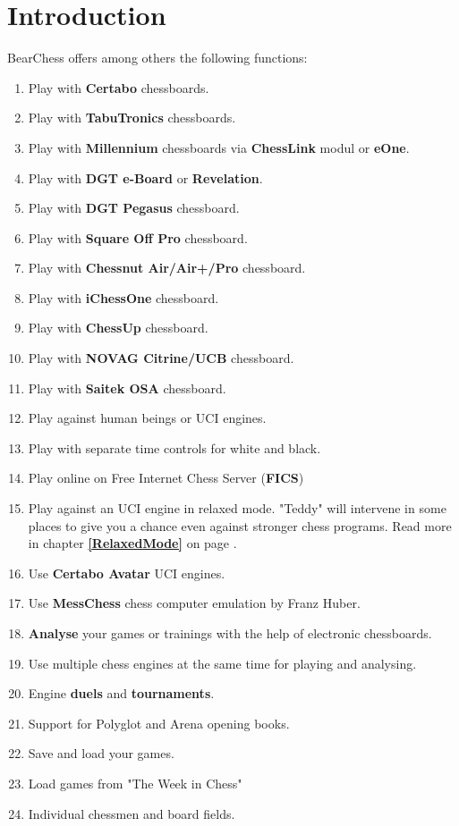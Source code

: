 \documentclass[11pt,a4paper]{article}
\begin{document}
\section{Introduction}
BearChess offers among others the following functions:
\begin{enumerate}
	  \item Play with \textbf{Certabo} chessboards.
	  \item Play with \textbf{TabuTronics} chessboards.	  
	  \item Play with \textbf{Millennium} chessboards via \textbf{ChessLink} modul or \textbf{eOne}.
 	  \item Play with \textbf{DGT e-Board} or \textbf{Revelation}.	  
	  \item Play with \textbf{DGT Pegasus} chessboard.	  
	  \item Play with \textbf{Square Off Pro} chessboard.	  	  
	  \item Play with \textbf{Chessnut Air/Air+/Pro} chessboard.	  	  	  
	  \item Play with \textbf{iChessOne} chessboard.	  	  	  	  
      \item Play with \textbf{ChessUp} chessboard.	  	  	  	  	  
	  \item Play with \textbf{NOVAG Citrine/UCB} chessboard.
	  \item Play with \textbf{Saitek OSA} chessboard.	  
  	  \item Play against human beings or UCI engines.
  	  \item Play with separate time controls for white and black.
  	  \item Play online on Free Internet Chess Server (\textbf{FICS})
  	  \item Play against an UCI engine in relaxed mode. "Teddy" will intervene in some places to give you a chance even against stronger chess programs. Read more in chapter \textbf{\ref{RelaxedMode}  } on page \pageref{RelaxedMode}.  	  
  	  \item Use \textbf{Certabo Avatar} UCI engines.  	  
  	  \item Use \textbf{MessChess} chess computer emulation by Franz Huber.  	    	  
  	  \item \textbf{Analyse} your games or trainings with the help of electronic chessboards.
  	  \item Use multiple chess engines at the same time for playing and analysing.
  	  \item Engine \textbf{duels} and \textbf{tournaments}.
  	  \item Support for Polyglot and Arena opening books.
  	  \item Save and load your games.
  	  \item Load games from "The Week in Chess"
  	  \item Individual chessmen and board fields.
\end{enumerate}
\end{document}
